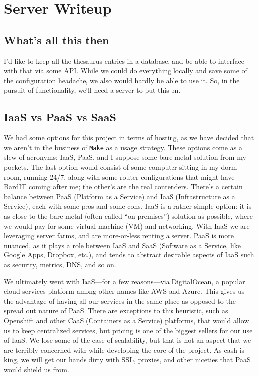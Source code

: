 \documentclass[11pt, twoside, reqno]{book}
\begin{document}
\startmain
\chapter{Server Writeup}

\section{What's all this then}


I'd like to keep all the thesaurus entries in a database, and be able to interface with that via some API. While we could do everything locally and save some of the configuration headache, we also would hardly be able to use it. So, in the pursuit of functionality, we'll need a server to put this on.

\section{IaaS vs PaaS vs SaaS}

We had some options for this project in terms of hosting, as we have decided that we aren't in the business of \texttt{Make} as a usage strategy. These options come as a slew of acronyms: IaaS, PaaS, and I suppose some bare metal solution from my pockets. The last option would consist of some computer sitting in my dorm room, running 24/7, along with some router configurations that might have BardIT coming after me; the other's are the real contenders. There's a certain balance between PaaS (Platform as a Service) and IaaS (Infrastructure as a Service), each with some pros and some cons. IaaS is a rather simple option: it is as close to the bare-metal (often called ``on-premises'') solution as possible, where we would pay for some virtual machine (VM) and networking. With IaaS we are leveraging server farms, and are more-or-less renting a server. PaaS is more nuanced, as it plays a role between IaaS and SaaS (Software as a Service, like Google Apps, Dropbox, etc.), and tends to abstract desirable aspects of IaaS such as security, metrics, DNS, and so on.

We ultimately went with IaaS—for a few reasons—via \href{https://www.digitalocean.com}{DigitalOcean}, a popular cloud services platform among other names like AWS and Azure. This gives us the advantage of having all our services in the same place as opposed to the spread out nature of PaaS. There are exceptions to this heuristic, such as Openshift and other CaaS (Containers as a Service) platforms, that would allow us to keep centralized services, but pricing is one of the biggest sellers for our use of IaaS. We lose some of the ease of scalability, but that is not an aspect that we are terribly concerned with while developing the core of the project. As cash is king, we will get our hands dirty with SSL, proxies, and other niceties that PaaS would shield us from.
\end{document}
